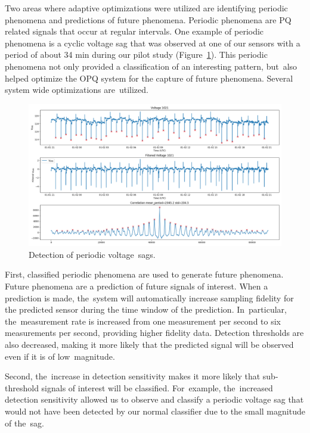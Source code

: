 \documentclass[energies,article,accept,moreauthors,pdftex]{Definitions/mdpi}
\begin{document}
Two areas where adaptive optimizations were utilized are identifying periodic phenomena and predictions of future phenomena. Periodic phenomena are PQ related signals that occur at regular intervals. One example of periodic phenomena is a cyclic voltage sag that was observed at one of our sensors with a period of about 34 min during our pilot study (Figure~\ref{fig:periodic-voltage-sags}). This periodic phenomena not only provided a classification of an interesting pattern, but~also helped optimize the OPQ system for the capture of future phenomena. Several system wide optimizations are~utilized.

\begin{figure}[H]
\centering
\includegraphics[width=0.90\linewidth]{images/pilot/periodic-voltage-sags.png}
\caption{Detection of periodic voltage~sags.}
\label{fig:periodic-voltage-sags}
\end{figure}

First, classified periodic phenomena are used to generate future phenomena. Future phenomena are a prediction of future signals of interest. When a prediction is made, the~system will automatically increase sampling fidelity for the predicted sensor during the time window of the prediction. In~particular, the~measurement rate is increased from one measurement per second to six measurements per second, providing higher fidelity data. Detection thresholds are also decreased, making it more likely that the predicted signal will be observed even if it is of low~magnitude.

Second, the~increase in detection sensitivity makes it more likely that sub-threshold signals of interest will be classified. For~example, the~increased detection sensitivity allowed us to observe and classify a periodic voltage sag that would not have been detected by our normal classifier due to the small magnitude of the~sag.
\end{document}
